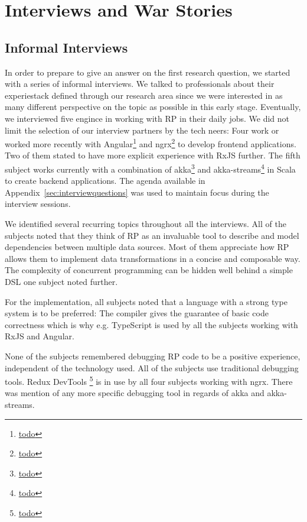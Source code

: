 \documentclass[12pt,a4paper]{article}
\begin{document}
\section{Interviews and War Stories}
\label{sec:interviews}

\subsection{Informal Interviews}

In order to prepare to give an answer on the first research question, we started with a series of informal interviews. We talked to professionals about their experiestack defined through our research area since we were interested in as many different perspective on the topic as possible in this early stage. Eventually, we interviewed five engince in working with RP in their daily jobs. We did not limit the selection of our interview partners by the tech neers: Four work or worked more recently with Angular\footnote{\url{todo}} and ngrx\footnote{\url{todo}} to develop frontend applications. Two of them stated to have more explicit experience with RxJS further. The fifth subject works currently with a combination of akka\footnote{\url{todo}} and akka-streams\footnote{\url{todo}} in Scala to create backend applications. The agenda available in Appendix~\ref{sec:interviewquestions} was used to maintain focus during the interview sessions.

We identified several recurring topics throughout all the interviews. All of the subjects noted that they think of RP as an invaluable tool to describe and model dependencies between multiple data sources. Most of them appreciate how RP allows them to implement data transformations in a concise and composable way. The complexity of concurrent programming can be hidden well behind a simple DSL one subject noted further.

For the implementation, all subjects noted that a language with a strong type system is to be preferred: The compiler gives the guarantee of basic code correctness which is why e.g. TypeScript is used by all the subjects working with RxJS and Angular. 

None of the subjects remembered debugging RP code to be a positive experience, independent of the technology used. All of the subjects use traditional debugging tools. Redux DevTools \footnote{\url{todo}} is in use by all four subjects working with ngrx. There was mention of any more specific debugging tool in regards of akka and akka-streams.
\end{document}

